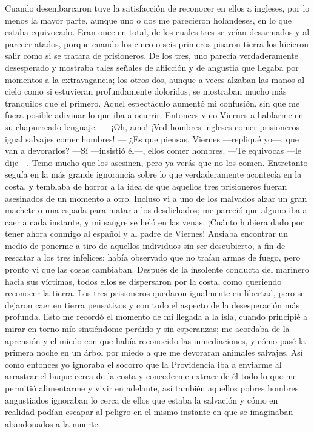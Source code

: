 \documentclass{novela}
\begin{document}
    Cuando desembarcaron tuve la satisfacción de reconocer en ellos a ingleses, por lo menos la mayor parte, aunque uno o dos me parecieron holandeses, en lo que estaba equivocado. Eran once en total, de los cuales tres se veían desarmados y al parecer atados, porque cuando los cinco o seis primeros pisaron tierra los hicieron salir como si se tratara de prisioneros. De los tres, uno parecía verdaderamente desesperado y mostraba tales señales de aflicción y de angustia que llegaba por momentos a la extravagancia; los otros dos, aunque a veces alzaban las manos al cielo como si estuvieran profundamente doloridos, se mostraban mucho más tranquilos que el primero.
    Aquel espectáculo aumentó mi confusión, sin que me fuera posible adivinar lo que iba a ocurrir. Entonces vino Viernes a hablarme en su chapurreado lenguaje.
    — ¡Oh, amo! ¡Ved hombres ingleses comer prisioneros igual salvajes comer hombres!
    — ¿Es que piensas, Viernes —repliqué yo—, que van a devorarlos?
    —Sí —insistió él—, ellos comer hombres.
    —Te equivocas —le dije—. Temo mucho que los asesinen, pero ya verás que no los comen.
    Entretanto seguía en la más grande ignorancia sobre lo que verdaderamente acontecía en la costa, y temblaba de horror a la idea de que aquellos tres prisioneros fueran asesinados de un momento a otro. Incluso vi a uno de los malvados alzar un gran machete o una espada para matar a los desdichados; me pareció que alguno iba a caer a cada instante, y mi sangre se heló en las venas.
    ¡Cuánto hubiera dado por tener ahora conmigo al español y al padre de Viernes! Ansiaba encontrar un medio de ponerme a tiro de aquellos individuos sin ser descubierto, a fin de rescatar a los tres infelices; había observado que no traían armas de fuego, pero pronto vi que las cosas cambiaban. Después de la insolente conducta del marinero hacia sus víctimas, todos ellos se dispersaron por la costa, como queriendo reconocer la tierra. Los tres prisioneros quedaron igualmente en libertad, pero se dejaron caer en tierra pensativos y con todo el aspecto de la desesperación más profunda.
    Esto me recordó el momento de mi llegada a la isla, cuando principié a mirar en torno mío sintiéndome perdido y sin esperanzas; me acordaba de la aprensión y el miedo con que había reconocido las inmediaciones, y cómo pasé la primera noche en un árbol por miedo a que me devoraran animales salvajes.
    Así como entonces yo ignoraba el socorro que la Providencia iba a enviarme al arrastrar el buque cerca de la costa y concederme extraer de él todo lo que me permitió alimentarme y vivir en adelante, así también aquellos pobres hombres angustiados ignoraban lo cerca de ellos que estaba la salvación y cómo en realidad podían escapar al peligro en el mismo instante en que se imaginaban abandonados a la muerte.
\end{document}
